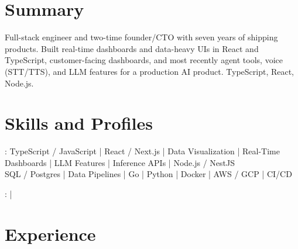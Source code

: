\documentclass[print]{jack-resume}
\begin{document}
\pagecolor{darkmodeBackground}


\begin{minipage}[t][1cm][t]{.03\textwidth}
    \hfill
\end{minipage}

\section{Summary}
Full-stack engineer and two-time founder/CTO with seven years of shipping products. Built real-time dashboards and data-heavy UIs in React and TypeScript, customer-facing dashboards, and most recently agent tools, voice (STT/TTS), and LLM features for a production AI product. TypeScript, React, Node.js.
\sectionsep

\section{Skills and Profiles}
:
TypeScript / JavaScript \hfill | \hfill
React / Next.js \hfill | \hfill
Data Visualization \hfill | \hfill
Real-Time Dashboards \hfill | \hfill
LLM Features \hfill | \hfill
Inference APIs \hfill | \hfill
Node.js / NestJS \\
\hspace{1.0cm} SQL / Postgres \hfill | \hfill
Data Pipelines \hfill | \hfill
Go \hfill | \hfill
Python \hfill | \hfill
Docker \hfill | \hfill
AWS / GCP \hfill | \hfill
CI/CD \\

\raggedright{
    :
      \href{https://www.linkedin.com/in/jack-sturtevant/}{ \ExternalLink} |
     \href{https://github.com/jacksturt}{ \ExternalLink}}

\section{Experience}
\end{document}
